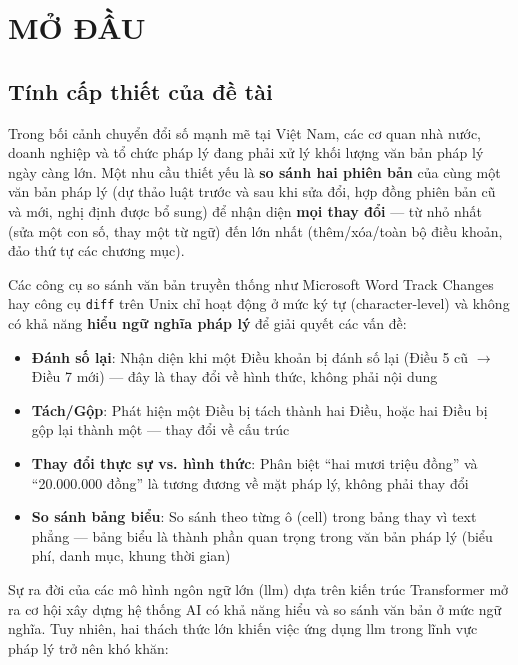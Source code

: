 \chapter{MỞ ĐẦU}

\section{Tính cấp thiết của đề tài}

Trong bối cảnh chuyển đổi số mạnh mẽ tại Việt Nam, các cơ quan nhà nước, doanh nghiệp và tổ chức pháp lý đang phải xử lý khối lượng văn bản pháp lý ngày càng lớn. Một nhu cầu thiết yếu là \textbf{so sánh hai phiên bản} của cùng một văn bản pháp lý (dự thảo luật trước và sau khi sửa đổi, hợp đồng phiên bản cũ và mới, nghị định được bổ sung) để nhận diện \textbf{mọi thay đổi} — từ nhỏ nhất (sửa một con số, thay một từ ngữ) đến lớn nhất (thêm/xóa/toàn bộ điều khoản, đảo thứ tự các chương mục).

Các công cụ so sánh văn bản truyền thống như Microsoft Word Track Changes hay công cụ \texttt{diff} trên Unix chỉ hoạt động ở mức ký tự (character-level) và không có khả năng \textbf{hiểu ngữ nghĩa pháp lý} để giải quyết các vấn đề:

\begin{itemize}
    \item \textbf{Đánh số lại}: Nhận diện khi một Điều khoản bị đánh số lại (Điều 5 cũ $\rightarrow$ Điều 7 mới) — đây là thay đổi về hình thức, không phải nội dung
    \item \textbf{Tách/Gộp}: Phát hiện một Điều bị tách thành hai Điều, hoặc hai Điều bị gộp lại thành một — thay đổi về cấu trúc
    \item \textbf{Thay đổi thực sự vs. hình thức}: Phân biệt ``hai mươi triệu đồng'' và ``20.000.000 đồng'' là tương đương về mặt pháp lý, không phải thay đổi
    \item \textbf{So sánh bảng biểu}: So sánh theo từng ô (cell) trong bảng thay vì text phẳng — bảng biểu là thành phần quan trọng trong văn bản pháp lý (biểu phí, danh mục, khung thời gian)
\end{itemize}

Sự ra đời của các mô hình ngôn ngữ lớn (\gls{llm}) dựa trên kiến trúc Transformer \cite{vaswani2017attention} mở ra cơ hội xây dựng hệ thống AI có khả năng hiểu và so sánh văn bản ở mức ngữ nghĩa. Tuy nhiên, hai thách thức lớn khiến việc ứng dụng \gls{llm} trong lĩnh vực pháp lý trở nên khó khăn:

